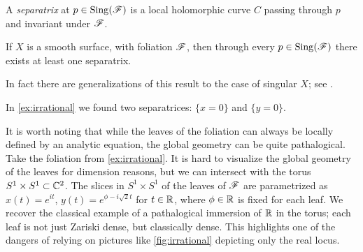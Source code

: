 \begin{definition}
    A \emph{separatrix} at $p\in\operatorname{Sing}(\mathscr{F})$ is a local holomorphic curve $C$
    passing through $p$ and invariant under $\mathscr{F}$.
\end{definition}

\begin{theorem}\label{thm:separatrix}
    If $X$ is a smooth surface, with foliation $\mathscr{F}$, then through every
    $p\in\operatorname{Sing}(\mathscr{F})$ there exists at least one separatrix.
\end{theorem}

In fact there are generalizations of this result to the case of singular $X$;
see \cite{camacho_88}.

\begin{example}
    In \cref{ex:irrational} we found two separatrices: $\{x=0\}$ and
    $\{y=0\}$.
\end{example}

It is worth noting that while the leaves of the foliation can always be locally
defined by an analytic equation, the global geometry can be quite pathalogical.
Take the foliation from \cref{ex:irrational}. It is hard to visualize the global
geometry of the leaves for dimension reasons, but we can intersect with the
torus $S^1\times S^1\subset\mathbb{C}^2$. The slices in $S^1\times S^1$ of the leaves of
$\mathscr{F}$ are parametrized as $x(t)=e^{it}$, $y(t)=e^{\phi-i\sqrt2t}$ for
$t\in\mathbb{R}$, where $\phi\in\mathbb{R}$ is fixed for each leaf. We recover the classical
example of a pathalogical immersion of $\mathbb{R}$ in the torus; each leaf is not just
Zariski dense, but classically dense. This highlights one of the dangers of
relying on pictures like \cref{fig:irrational} depicting only the real locus.

